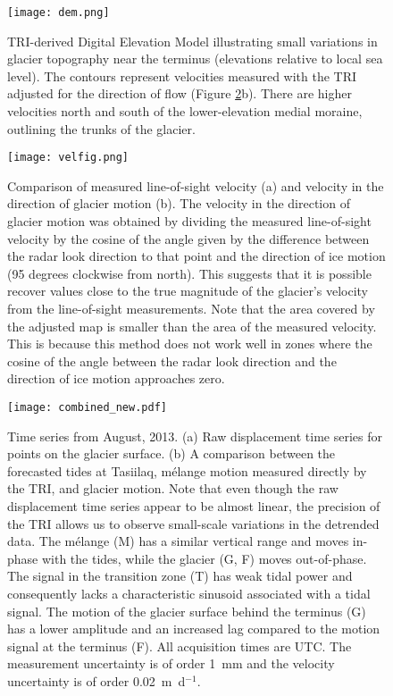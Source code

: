 \begin{figure}
\centering
\texttt{[image: dem.png]}
\caption[TRI-derived Digital Elevation Model illustrating small variations in glacier topography near the terminus (elevations relative to local sea level).]{TRI-derived Digital Elevation Model illustrating small variations in glacier topography near the terminus (elevations relative to local sea level). The contours represent velocities measured with the TRI adjusted for the direction of flow (Figure \ref{fig:velocities}b). There are higher velocities north and south of the lower-elevation medial moraine, outlining the trunks of the glacier. }
\label{fig:DEM}
\end{figure}


\begin{figure}
\centering
\texttt{[image: velfig.png]}
\caption[Comparison of measured line-of-sight velocity (a) and velocity in the direction of glacier motion (b).]{Comparison of measured line-of-sight velocity (a) and velocity in the direction of glacier motion (b). The velocity in the direction of glacier motion was obtained by dividing the measured line-of-sight velocity by the cosine of the angle given by the difference between the radar look direction to that point and the direction of ice motion (95 degrees clockwise from north). This suggests that it is possible recover values close to the true magnitude of the glacier's velocity from the line-of-sight measurements. Note that the area covered by the adjusted map is smaller than the area of the measured velocity. This is because this method does not work well in zones where the cosine of the angle between the radar look direction and the direction of ice motion approaches zero.}
\label{fig:velocities}
\end{figure}


\begin{figure}
\centering
\texttt{[image: combined\_new.pdf]}
\caption[Time series from August, 2013.]{Time series from August, 2013. (a) Raw displacement time series for points on the glacier surface. (b) A comparison between the forecasted tides at Tasiilaq, m\'elange motion measured directly by the TRI, and glacier motion. Note that even though the raw displacement time series appear to be almost linear, the precision of the TRI allows us to observe small-scale variations in the detrended data. The m\'elange (M) has a similar vertical range and moves in-phase with the tides, while the glacier  (G, F) moves out-of-phase. The signal in the transition zone (T) has weak tidal power and consequently lacks a characteristic sinusoid associated with a tidal signal. The motion of the glacier surface behind the terminus (G) has a lower amplitude and an increased lag compared to the motion signal at the terminus (F). All acquisition times are UTC. The measurement uncertainty is of order 1~mm and the velocity uncertainty is of order 0.02~m~d$^{-1}$. }
\label{fig:transition}
\end{figure}

